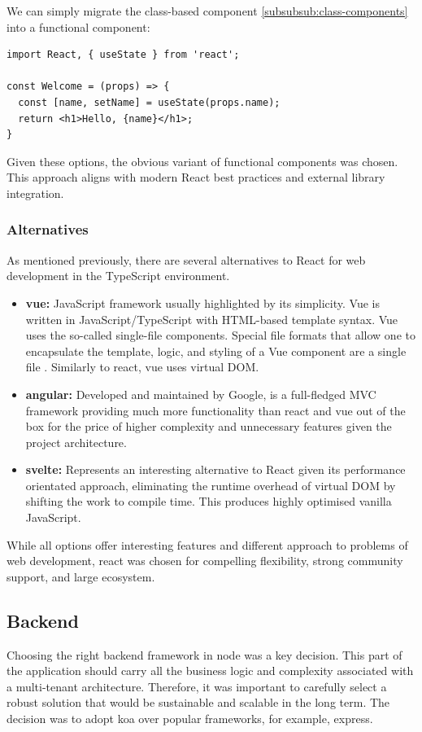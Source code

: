 We can simply migrate the class-based component \ref{subsubsub:class-components} into a functional component:

\medskip
\begin{lstlisting}[caption=React class based component exmaple]
import React, { useState } from 'react';

const Welcome = (props) => {
  const [name, setName] = useState(props.name);
  return <h1>Hello, {name}</h1>;
}
\end{lstlisting}

Given these options, the obvious variant of functional components was chosen.
This approach aligns with modern React best practices and external library integration.


\subsubsection{Alternatives}
As mentioned previously, there are several alternatives to React for web development in the TypeScript environment.
\begin{itemize}
    \item \textbf{\gls{vue}:} JavaScript framework usually highlighted by its simplicity. Vue is written in JavaScript/TypeScript with HTML-based template syntax. Vue uses the so-called single-file components. Special file formats that allow one to encapsulate the template, logic, and styling of a Vue component are a single file \cite{vue-docs}. Similarly to \gls{react}, \gls{vue} uses virtual \ac{DOM}.
    \item \textbf{\gls{angular}:} Developed and maintained by Google, is a full-fledged \ac{MVC} framework providing much more functionality than \gls{react} and \gls{vue} out of the box for the price of higher complexity and unnecessary features given the project architecture.
    \item \textbf{\gls{svelte}:} Represents an interesting alternative to React given its performance orientated approach, eliminating the runtime overhead of virtual \ac{DOM} by shifting the work to compile time. This produces highly optimised vanilla JavaScript. 
\end{itemize}

While all options offer interesting features and different approach to problems of web development, \gls{react} was chosen for compelling flexibility, strong community support, and large ecosystem.


\subsection{Backend}
\label{subsec:backend}
Choosing the right backend framework in \gls{node} was a key decision.
This part of the application should carry all the business logic and complexity associated with a multi-tenant architecture.
Therefore, it was important to carefully select a robust solution that would be sustainable and scalable in the long term.
The decision was to adopt \gls{koa} over popular frameworks, for example, \gls{express}.

